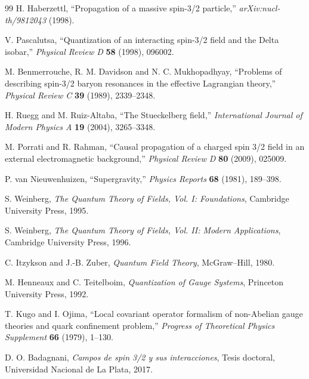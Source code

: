 \documentclass[11pt,a4paper]{article}
\numberwithin{equation}{section}
\begin{document}
\begin{thebibliography}{99}
H. Haberzettl,
``Propagation of a massive spin-3/2 particle,''
\emph{arXiv:nucl-th/9812043} (1998).

V. Pascalutsa,
``Quantization of an interacting spin-3/2 field and the Delta isobar,''
\emph{Physical Review D} \textbf{58} (1998), 096002.

M. Benmerrouche, R. M. Davidson and N. C. Mukhopadhyay,
``Problems of describing spin-3/2 baryon resonances in the effective Lagrangian theory,''
\emph{Physical Review C} \textbf{39} (1989), 2339--2348.

H. Ruegg and M. Ruiz-Altaba,
``The Stueckelberg field,''
\emph{International Journal of Modern Physics A} \textbf{19} (2004), 3265--3348.

M. Porrati and R. Rahman,
``Causal propagation of a charged spin 3/2 field in an external electromagnetic background,''
\emph{Physical Review D} \textbf{80} (2009), 025009.

P. van Nieuwenhuizen,
``Supergravity,''
\emph{Physics Reports} \textbf{68} (1981), 189--398.

S. Weinberg,
\emph{The Quantum Theory of Fields, Vol. I: Foundations},
Cambridge University Press, 1995.

S. Weinberg,
\emph{The Quantum Theory of Fields, Vol. II: Modern Applications},
Cambridge University Press, 1996.

C. Itzykson and J.-B. Zuber,
\emph{Quantum Field Theory},
McGraw--Hill, 1980.

M. Henneaux and C. Teitelboim,
\emph{Quantization of Gauge Systems},
Princeton University Press, 1992.

T. Kugo and I. Ojima,
``Local covariant operator formalism of non-Abelian gauge theories and quark confinement problem,''
\emph{Progress of Theoretical Physics Supplement} \textbf{66} (1979), 1--130.

D. O. Badagnani,
\emph{Campos de spin 3/2 y sus interacciones},
Tesis doctoral, Universidad Nacional de La Plata, 2017.

\end{thebibliography}
\end{document}
